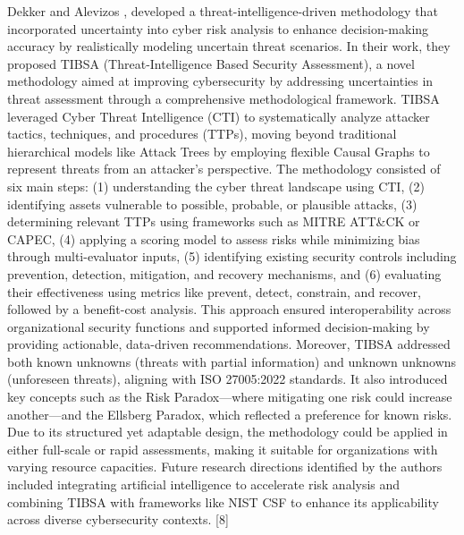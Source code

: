 \documentclass[12pt,a4paper]{report}
\begin{document}
Dekker and Alevizos , developed a threat-intelligence-driven methodology that incorporated uncertainty into cyber risk analysis to enhance decision-making accuracy by realistically modeling uncertain threat scenarios. In their work, they proposed TIBSA (Threat-Intelligence Based Security Assessment), a novel methodology aimed at improving cybersecurity by addressing uncertainties in threat assessment through a comprehensive methodological framework. TIBSA leveraged Cyber Threat Intelligence (CTI) to systematically analyze attacker tactics, techniques, and procedures (TTPs), moving beyond traditional hierarchical models like Attack Trees by employing flexible Causal Graphs to represent threats from an attacker’s perspective. The methodology consisted of six main steps: (1) understanding the cyber threat landscape using CTI, (2) identifying assets vulnerable to possible, probable, or plausible attacks, (3) determining relevant TTPs using frameworks such as MITRE ATT\&CK or CAPEC, (4) applying a scoring model to assess risks while minimizing bias through multi-evaluator inputs, (5) identifying existing security controls including prevention, detection, mitigation, and recovery mechanisms, and (6) evaluating their effectiveness using metrics like prevent, detect, constrain, and recover, followed by a benefit-cost analysis. This approach ensured interoperability across organizational security functions and supported informed decision-making by providing actionable, data-driven recommendations. Moreover, TIBSA addressed both known unknowns (threats with partial information) and unknown unknowns (unforeseen threats), aligning with ISO 27005:2022 standards. It also introduced key concepts such as the Risk Paradox—where mitigating one risk could increase another—and the Ellsberg Paradox, which reflected a preference for known risks. Due to its structured yet adaptable design, the methodology could be applied in either full-scale or rapid assessments, making it suitable for organizations with varying resource capacities. Future research directions identified by the authors included integrating artificial intelligence to accelerate risk analysis and combining TIBSA with frameworks like NIST CSF to enhance its applicability across diverse cybersecurity contexts. [8]
\end{document}
